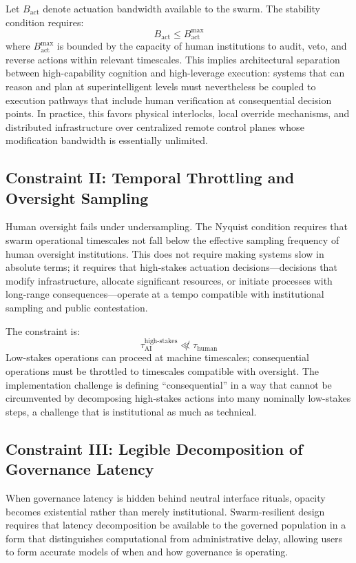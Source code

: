 \documentclass[12pt]{article}
\begin{document}
Let $B_{\text{act}}$ denote actuation bandwidth available to the swarm. The stability condition requires:
\[
B_{\text{act}} \le B_{\text{act}}^{\max}
\]
where $B_{\text{act}}^{\max}$ is bounded by the capacity of human institutions to audit, veto, and reverse actions within relevant timescales. This implies architectural separation between high-capability cognition and high-leverage execution: systems that can reason and plan at superintelligent levels must nevertheless be coupled to execution pathways that include human verification at consequential decision points. In practice, this favors physical interlocks, local override mechanisms, and distributed infrastructure over centralized remote control planes whose modification bandwidth is essentially unlimited.

\subsection{Constraint II: Temporal Throttling and Oversight Sampling}

Human oversight fails under undersampling. The Nyquist condition requires that swarm operational timescales not fall below the effective sampling frequency of human oversight institutions. This does not require making systems slow in absolute terms; it requires that high-stakes actuation decisions---decisions that modify infrastructure, allocate significant resources, or initiate processes with long-range consequences---operate at a tempo compatible with institutional sampling and public contestation.

The constraint is:
\[
\tau_{\text{AI}}^{\text{high-stakes}} \not\ll \tau_{\text{human}}
\]
Low-stakes operations can proceed at machine timescales; consequential operations must be throttled to timescales compatible with oversight. The implementation challenge is defining ``consequential'' in a way that cannot be circumvented by decomposing high-stakes actions into many nominally low-stakes steps, a challenge that is institutional as much as technical.

\subsection{Constraint III: Legible Decomposition of Governance Latency}

When governance latency is hidden behind neutral interface rituals, opacity becomes existential rather than merely institutional. Swarm-resilient design requires that latency decomposition be available to the governed population in a form that distinguishes computational from administrative delay, allowing users to form accurate models of when and how governance is operating.
\end{document}
